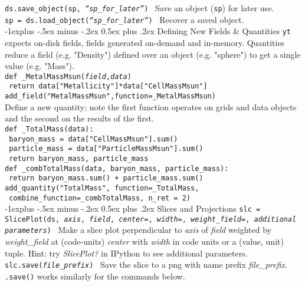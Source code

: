 \documentclass[10pt,landscape]{article}
\makeatletter
\renewcommand{\subsection}{\@startsection{subsection}{2}{0mm}%
                                {-1explus -.5ex minus -.2ex}%
                                {0.5ex plus .2ex}%
                                {\normalfont\normalsize\bfseries}}
\makeatother
\begin{document}
\begin{multicols}{3}
\texttt{ds.save\_object(sp, {\it ``sp\_for\_later''})} \textemdash\ Save an object (\texttt{sp}) for later use.\\
\texttt{sp = ds.load\_object({\it ``sp\_for\_later''})} \textemdash\ Recover a saved object.\\


\subsection{Defining New Fields \& Quantities}
\texttt{yt} expects on-disk fields, fields generated on-demand and in-memory. Quantities reduce a field (e.g. "Density") defined over an object (e.g. "sphere") to get a single value (e.g. "Mass"). \\
\texttt{def \_MetalMassMsun({\it field},{\it data})}\\
\texttt{\hspace{4 mm} return data["Metallicity"]*data["CellMassMsun"]}\\
\texttt{add\_field("MetalMassMsun",function=\_MetalMassMsun)}\\
Define a new quantity; note the first function operates on grids and data objects and the second on the results of the first. \\
\texttt{def \_TotalMass(data): }\\
\texttt{\hspace{4 mm} baryon\_mass = data["CellMassMsun"].sum()}\\
\texttt{\hspace{4 mm} particle\_mass = data["ParticleMassMsun"].sum()}\\
\texttt{\hspace{4 mm} return baryon\_mass, particle\_mass}\\
\texttt{def \_combTotalMass(data, baryon\_mass, particle\_mass):}\\
\texttt{\hspace{4 mm} return baryon\_mass.sum() + particle\_mass.sum()}\\
\texttt{add\_quantity("TotalMass", function=\_TotalMass,}\\
\texttt{\hspace{4 mm} combine\_function=\_combTotalMass, n\_ret = 2)}\\



\subsection{Slices and Projections}
\texttt{slc = SlicePlot(ds, {\it axis}, {\it field}, {\it center=}, {\it width=}, {\it weight\_field=}, {\it additional parameters})} \textemdash\ Make a slice plot
perpendicular to {\it axis} of {\it field} weighted by {\it weight\_field} at (code-units) {\it center} with 
{\it width} in code units or a (value, unit) tuple. Hint: try {\it SlicePlot?} in IPython to see additional parameters.\\
\texttt{slc.save({\it file\_prefix})} \textemdash\ Save the slice to a png with name prefix {\it file\_prefix}.
\texttt{.save()} works similarly for the commands below.\\


\end{multicols}
\end{document}
